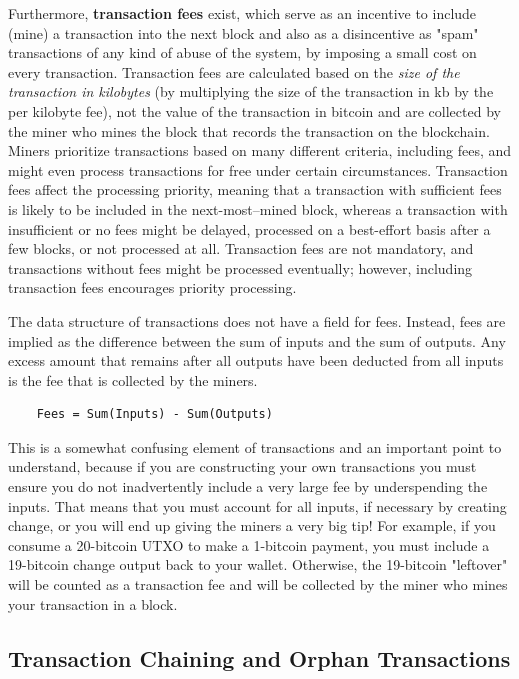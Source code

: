 \documentclass{article}
\newcounter{example}[section]
\begin{document}
    Furthermore, \textbf{transaction fees} exist, which serve as an incentive to include (mine) a transaction into the next block and also as a disincentive as "spam" transactions of any kind of abuse of the system, by imposing a small cost on every transaction. Transaction fees are calculated based on the \textit{size of the transaction in kilobytes} (by multiplying the size of the transaction in kb by the per kilobyte fee), not the value of the transaction in bitcoin and are collected by the miner who mines the block that records the transaction on the blockchain. Miners prioritize transactions based on many different criteria, including fees, and might even process transactions for free under certain circumstances. Transaction fees affect the processing priority, meaning that a transaction with sufficient fees is likely to be included in the next-most–mined block, whereas a transaction with insufficient or no fees might be delayed, processed on a best-effort basis after a few blocks, or not processed at all. Transaction fees are not mandatory, and transactions without fees might be processed eventually; however, including transaction fees encourages priority processing.

    The data structure of transactions does not have a field for fees. Instead, fees are implied as the difference between the sum of inputs and the sum of outputs. Any excess amount that remains after all outputs have been deducted from all inputs is the fee that is collected by the miners.

    \begin{lstlisting}
    Fees = Sum(Inputs) - Sum(Outputs)
    \end{lstlisting}

    This is a somewhat confusing element of transactions and an important point to understand, because if you are constructing your own transactions you must ensure you do not inadvertently include a very large fee by underspending the inputs. That means that you must account for all inputs, if necessary by creating change, or you will end up giving the miners a very big tip! For example, if you consume a 20-bitcoin UTXO to make a 1-bitcoin payment, you must include a 19-bitcoin change output back to your wallet. Otherwise, the 19-bitcoin "leftover" will be counted as a transaction fee and will be collected by the miner who mines your transaction in a block.

  \subsection{Transaction Chaining and Orphan Transactions}
\end{document}
